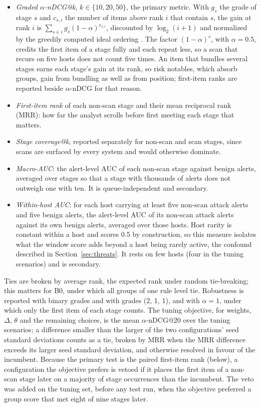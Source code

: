 \documentclass[conference]{IEEEtran}
\begin{document}
\begin{itemize}
\item \emph{Graded $\alpha$-nDCG@k}, $k \in \{10, 20, 50\}$, the primary metric. With $g_s$ the grade of stage $s$ and $c_{s,i}$ the number of items above rank $i$ that contain $s$, the gain at rank $i$ is $\sum_{s \in i} g_s (1-\alpha)^{c_{s,i}}$, discounted by $\log_2(i+1)$ and normalized by the greedily computed ideal ordering \cite{ref24}. The factor $(1-\alpha)^{c}$, with $\alpha = 0.5$, credits the first item of a stage fully and each repeat less, so a scan that recurs on five hosts does not count five times. An item that bundles several stages earns each stage's gain at its rank, so risk notables, which absorb groups, gain from bundling as well as from position; first-item ranks are reported beside $\alpha$-nDCG for that reason.
\item \emph{First-item rank} of each non-scan stage and their mean reciprocal rank (MRR): how far the analyst scrolls before first meeting each stage that matters.
\item \emph{Stage coverage@k}, reported separately for non-scan and scan stages, since scans are surfaced by every system and would otherwise dominate.
\item \emph{Macro-AUC}: the alert-level AUC of each non-scan stage against benign alerts, averaged over stages so that a stage with thousands of alerts does not outweigh one with ten. It is queue-independent and secondary.
\item \emph{Within-host AUC}: for each host carrying at least five non-scan attack alerts and five benign alerts, the alert-level AUC of its non-scan attack alerts against its own benign alerts, averaged over those hosts. Host rarity is constant within a host and scores 0.5 by construction, so this measure isolates what the window score adds beyond a host being rarely active, the confound described in Section~\ref{sec:threats}. It rests on few hosts (four in the tuning scenarios) and is secondary.
\end{itemize}
Ties are broken by average rank, the expected rank under random tie-breaking; this matters for B0, under which all groups of one rule level tie. Robustness is reported with binary grades and with grades (2, 1, 1), and with $\alpha = 1$, under which only the first item of each stage counts. The tuning objective, for weights, $\Delta$, $\theta$ and the remaining choices, is the mean $\alpha$-nDCG@20 over the tuning scenarios; a difference smaller than the larger of the two configurations' seed standard deviations counts as a tie, broken by MRR when the MRR difference exceeds its larger seed standard deviation, and otherwise resolved in favour of the incumbent. Because the primary test is the paired first-item rank (below), a configuration the objective prefers is vetoed if it places the first item of a non-scan stage later on a majority of stage occurrences than the incumbent. The veto was added on the tuning set, before any test run, when the objective preferred a group score that met eight of nine stages later.
\end{document}
